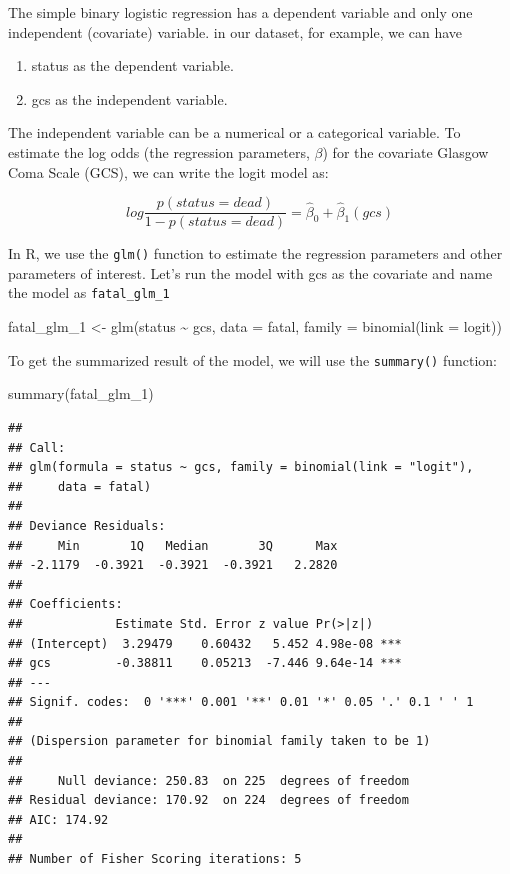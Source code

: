 \documentclass[
  10pt,
]{krantz}
\newenvironment{Shaded}{\begin{snugshade}}{\end{snugshade}}
\newcommand{\AttributeTok}[1]{\textcolor[rgb]{0.77,0.63,0.00}{#1}}
\newcommand{\FunctionTok}[1]{\textcolor[rgb]{0.00,0.00,0.00}{#1}}
\newcommand{\NormalTok}[1]{#1}
\newcommand{\OtherTok}[1]{\textcolor[rgb]{0.56,0.35,0.01}{#1}}
\newcommand{\SpecialCharTok}[1]{\textcolor[rgb]{0.00,0.00,0.00}{#1}}
\newcommand{\StringTok}[1]{\textcolor[rgb]{0.31,0.60,0.02}{#1}}
\providecommand{\tightlist}{%
  \setlength{\itemsep}{0pt}\setlength{\parskip}{0pt}}
\begin{document}
The simple binary logistic regression has a dependent variable and only one independent (covariate) variable. in our dataset, for example, we can have

\begin{enumerate}
\def\labelenumi{\arabic{enumi}.}
\tightlist
\item
  status as the dependent variable.
\item
  gcs as the independent variable.
\end{enumerate}

The independent variable can be a numerical or a categorical variable. To estimate the log odds (the regression parameters, \(\beta\)) for the covariate Glasgow Coma Scale (GCS), we can write the logit model as:

\[log\frac{p(status = dead)}{1 - p(status = dead)}  = \hat\beta_0 + \hat\beta_1(gcs)\]

In R, we use the \texttt{glm()} function to estimate the regression parameters and other parameters of interest. Let's run the model with gcs as the covariate and name the model as \texttt{fatal\_glm\_1}

\begin{Shaded}
\begin{Highlighting}[]
\NormalTok{fatal\_glm\_1 }\OtherTok{\textless{}{-}} 
  \FunctionTok{glm}\NormalTok{(status }\SpecialCharTok{\textasciitilde{}}\NormalTok{ gcs, }
      \AttributeTok{data =}\NormalTok{ fatal, }
      \AttributeTok{family =} \FunctionTok{binomial}\NormalTok{(}\AttributeTok{link =} \StringTok{\textquotesingle{}logit\textquotesingle{}}\NormalTok{))}
\end{Highlighting}
\end{Shaded}

To get the summarized result of the model, we will use the \texttt{summary()} function:

\begin{Shaded}
\begin{Highlighting}[]
\FunctionTok{summary}\NormalTok{(fatal\_glm\_1)}
\end{Highlighting}
\end{Shaded}

\begin{verbatim}
## 
## Call:
## glm(formula = status ~ gcs, family = binomial(link = "logit"), 
##     data = fatal)
## 
## Deviance Residuals: 
##     Min       1Q   Median       3Q      Max  
## -2.1179  -0.3921  -0.3921  -0.3921   2.2820  
## 
## Coefficients:
##             Estimate Std. Error z value Pr(>|z|)    
## (Intercept)  3.29479    0.60432   5.452 4.98e-08 ***
## gcs         -0.38811    0.05213  -7.446 9.64e-14 ***
## ---
## Signif. codes:  0 '***' 0.001 '**' 0.01 '*' 0.05 '.' 0.1 ' ' 1
## 
## (Dispersion parameter for binomial family taken to be 1)
## 
##     Null deviance: 250.83  on 225  degrees of freedom
## Residual deviance: 170.92  on 224  degrees of freedom
## AIC: 174.92
## 
## Number of Fisher Scoring iterations: 5
\end{verbatim}
\end{document}
